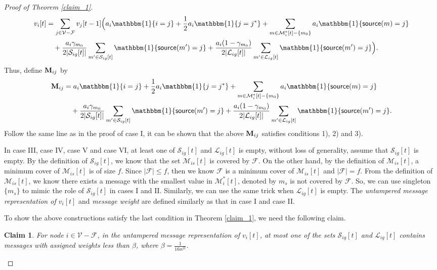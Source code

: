 \documentclass[letterpaper, 11pt]{article}
\newtheorem{claim}[theorem]{Claim}
\newcommand{\calF}{{\mathcal{F}}}
\newcommand{\calL}{{\mathcal{L}}}
\newcommand{\calM}{{\mathcal{M}}}
\newcommand{\calS}{{\mathcal{S}}}
\newcommand{\calV}{{\mathcal{V}}}
\begin{document}
\begin{proof}[Proof of Theorem \ref{claim_1}]
\begin{align*}
v_i[t]&=\sum_{j\in \calV-\calF}v_j[t-1]\Big{(}a_i\mathbbm{1}\{i=j\}
      +\frac{1}{2}a_i\mathbbm{1}\{j=j^*\}+\sum_{m\in \calM_i^*[t]-\{m_0\}}a_i\mathbbm{1}\{\mathsf{source}(m)=j\}\\
      &\quad +\frac{a_i\gamma_{m_0}}{2|\calS_{ig}[t]|}\sum_{m^{\prime}\in \calS_{ig}[t]}\mathbbm{1}\{\mathsf{source}(m^{\prime})=j\}+\frac{a_i(1-\gamma_{m_0})}{2|\calL_{ig}[t]|}\sum_{m^{\prime}\in \calL_{ig}[t]}\mathbbm{1}\{\mathsf{source}(m^{\prime})=j\}
      \Big{)}.
\end{align*}
Thus, define ${\bf M}_{ij}$ by
\begin{align*}
{\bf M}_{ij}&=a_i\mathbbm{1}\{i=j\}
      +\frac{1}{2}a_i\mathbbm{1}\{j=j^*\}+\sum_{m\in \calM_i^*[t]-\{m_0\}}a_i\mathbbm{1}\{\mathsf{source}(m)=j\}\\
      &\quad +\frac{a_i\gamma_{m_0}}{2|\calS_{ig}[t]|}\sum_{m^{\prime}\in \calS_{ig}[t]}\mathbbm{1}\{\mathsf{source}(m^{\prime})=j\}+\frac{a_i(1-\gamma_{m_0})}{2|\calL_{ig}[t]|}\sum_{m^{\prime}\in \calL_{ig}[t]}\mathbbm{1}\{\mathsf{source}(m^{\prime})=j\}.
\end{align*}
Follow the same line as in the proof of case I, it can be shown that the above ${\bf M}_{ij}$ satisfies conditions 1), 2) and 3).


In case III, case IV, case V and case VI, at least one of $\calS_{ig}[t]$ and $\calL_{ig}[t]$ is empty, without loss of generality, assume that $\calS_{ig}[t]$ is empty. By the definition of $\calS_{ig}[t]$, we know that the set $\calM_{is}[t]$ is covered by $\calF$. On the other hand, by the definition of $\calM_{is}[t]$, a minimum cover of $\calM_{is}[t]$ is of size $f$. Since $|\calF|\le f$, then we know $\calF$ is a minimum cover of $\calM_{is}[t]$ and $|\calF|=f$.
 From the definition of $\calM_{is}[t]$, we know there exists a message with the smallest value in $\calM^*_i[t]$, denoted by $m_s$ is not covered by $\calF$. So, we can
  use singleton $\{m_s\}$ to mimic the role of $\calS_{ig}[t]$ in cases I and II. Similarly, we can use the same trick when $\calL_{ig}[t]$ is empty. The \emph{untampered message representation of $v_i[t]$} and \emph{message weight} are defined similarly as that in case I and case II.






To show the above constructions satisfy the last condition in Theorem \ref{claim_1}, we need the following claim.

\begin{claim}
\label{claimw}
For node $i\in \calV-\calF$, in the untampered message representation of $v_i[t]$, at most one of the sets $\calS_{ig}[t]$ and $\calL_{ig}[t]$ contains messages with assigned weights less than $\beta$, where $\beta=\frac{1}{16n^{2l}}$.
\end{claim}


\end{proof}
\end{document}
